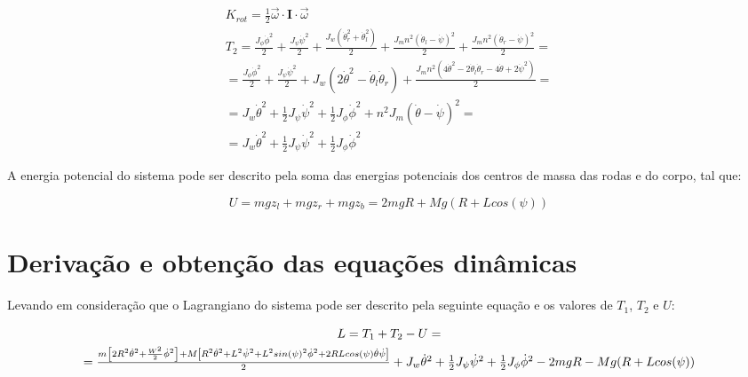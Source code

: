 \documentclass[10pt]{article}
\begin{document}
\begin{equation}
\begin{gathered}
    K_{rot} = \frac{1}{2} \vec{\omega} \cdot \mathbf{I} \cdot \vec{\omega} \\
    T_2 = \frac{J_{\phi}\dot{\phi}^2}{2} + \frac{J_{\psi}\dot{\psi}^2}{2} + \frac{J_w(\dot{\theta}_r^2 + \dot{\theta}_l^2)}{2} + \frac{J_m n^2(\dot{\theta}_l - \dot{\psi})^2}{2} + \frac{J_m n^2(\dot{\theta}_r - \dot{\psi})^2}{2} = \\
    = \frac{J_{\phi}\dot{\phi}^2}{2} + \frac{J_{\psi}\dot{\psi}^2}{2} + J_w(2\dot{\theta}^2 - \dot{\theta}_l\dot{\theta}_r) + \frac{J_mn^2 (4\dot{\theta}^2 - 2\dot{\theta}_l\dot{\theta}_r - 4 \dot{\theta} + 2 \dot{\psi}^2)}{2} = \\
    = J_w \dot{\theta}^2 + \frac{1}{2} J_{\psi} \dot{\psi}^2 + \frac{1}{2} J_{\phi} \dot{\phi}^2 + n^2 J_m (\dot{\theta} - \dot{\psi})^2 = \\
    = J_w \dot{\theta}^2 + \frac{1}{2} J_{\psi} \dot{\psi}^2 + \frac{1}{2} J_{\phi} \dot{\phi}^2
\end{gathered}
\end{equation}

\quad A energia potencial do sistema pode ser descrito pela soma das energias potenciais dos centros de massa das rodas e do corpo, tal que:

\begin{equation}
    U = mgz_l + mgz_r + mgz_b = 2mgR + Mg(R + Lcos(\psi))
\end{equation}

\section{Derivação e obtenção das equações dinâmicas}

\quad Levando em consideração que o Lagrangiano do sistema pode ser descrito pela seguinte equação e os valores de $T_1$, $T_2$ e $U$:

\begin{equation}
\begin{gathered}
    L = T_1 + T_2 - U = \\
    \scalebox{1}{$
    = \frac{m \left[2R^2\dot{\theta}^2 + \frac{W^2}{2}\dot{\phi}^2\right] + M \left[ R^2 \dot{\theta}^2 + L^2\dot{\psi}^2 + L^2 sin(\psi)^2 \dot{\phi}^2 + 2RL cos(\psi)\dot{\theta}\dot{\psi}\right]}{2}
    + J_w \dot{\theta}^2 + \frac{1}{2} J_{\psi} \dot{\psi}^2 + \frac{1}{2} J_{\phi} \dot{\phi}^2
    - 2mgR - Mg(R + Lcos(\psi))
    $}
\end{gathered}
\end{equation}
\end{document}
